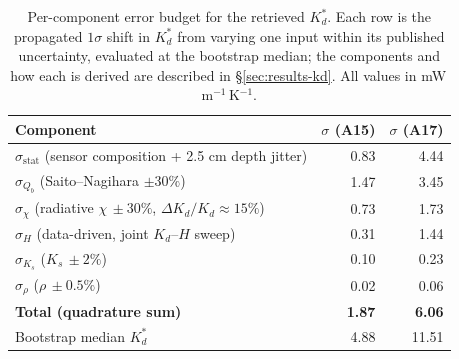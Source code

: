 \documentclass[11pt]{article}
\begin{document}
\begin{table}[!htbp]
\centering
\small
\caption{Per-component error budget for the retrieved $K_d^{*}$. Each
row is the propagated $1\sigma$ shift in $K_d^{*}$ from varying one
input within its published uncertainty, evaluated at the bootstrap
median; the components and how each is derived are described in
\S\ref{sec:results-kd}. All values in mW\,m$^{-1}$\,K$^{-1}$.}
\label{tab:errorbudget}
\begin{tabular}{lrr}
\toprule
Component & $\sigma$ (A15) & $\sigma$ (A17) \\
\midrule
$\sigma_\mathrm{stat}$ (sensor composition + 2.5 cm depth jitter) & 0.83 & 4.44 \\
$\sigma_{Q_b}$  (Saito--Nagihara $\pm 30\%$)                       & 1.47 & 3.45 \\
$\sigma_\chi$   (radiative $\chi\,\pm 30\%$, $\Delta K_d/K_d\!\approx\!15\%$) & 0.73 & 1.73 \\
$\sigma_H$      (data-driven, joint $K_d$--$H$ sweep)              & 0.31 & 1.44 \\
$\sigma_{K_s}$  ($K_s\,\pm 2\%$)                                    & 0.10 & 0.23 \\
$\sigma_\rho$   ($\rho\,\pm 0.5\%$)                                 & 0.02 & 0.06 \\
\midrule
\textbf{Total (quadrature sum)}                                     & \textbf{1.87} & \textbf{6.06} \\
Bootstrap median $K_d^{*}$                                          & 4.88 & 11.51 \\
\bottomrule
\end{tabular}
\end{table}
\end{document}
